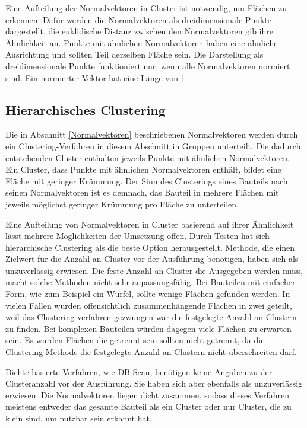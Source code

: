 \smallskip

Eine Aufteilung der Normalvektoren in Cluster ist notwendig, um Flächen zu erkennen. Dafür werden die Normalvektoren als dreidimensionale Punkte dargestellt, die euklidische Distanz zwischen den Normalvektoren gib ihre Ähnlichkeit an. 
Punkte mit ähnlichen Normalvektoren haben eine ähnliche Ausrichtung und sollten Teil derselben Fläche sein. Die Darstellung als dreidimensionale Punkte funktioniert nur, wenn alle Normalvektoren normiert sind. Ein normierter Vektor hat eine Länge von 1. 

\subsection{Hierarchisches Clustering}
\label{Hierarchisches Clustering}

Die in Abschnitt \ref{Normalvektoren} beschriebenen Normalvektoren werden durch ein Clustering-Verfahren in diesem Abschnitt in Gruppen unterteilt. Die dadurch entstehenden Cluster enthalten jeweils Punkte mit ähnlichen Normalvektoren. Ein Cluster, dass Punkte mit ähnlichen Normalvektoren enthält,
bildet eine Fläche mit geringer Krümmung. Der Sinn des Clusterings eines Bauteils nach seinen Normalvektoren ist es demnach, das Bauteil in mehrere Flächen mit jeweils möglichst geringer Krümmung pro Fläche zu unterteilen.

\smallskip

Eine Aufteilung von Normalvektoren in Cluster basierend auf ihrer Ähnlichkeit lässt mehrere Möglichkeiten der Umsetzung offen. Durch Testen hat sich hierarchische Clustering als die beste Option herausgestellt. 
Methode, die einen Zielwert für die Anzahl an Cluster vor der Ausführung benötigen, haben sich als unzuverlässig erwiesen. Die feste Anzahl an Cluster die Ausgegeben werden muss, macht solche Methoden nicht sehr anpassungsfähig. 
Bei Bauteilen mit einfacher Form, wie zum Beispiel ein Würfel, sollte wenige Flächen gefunden werden. In vielen Fällen wurden offensichtlich zusammenhängende Flächen in zwei geteilt, 
weil das Clustering verfahren gezwungen war die festgelegte Anzahl an Clustern zu finden. Bei komplexen Bauteilen würden dagegen viele Flächen zu erwarten sein. Es wurden Flächen die getrennt sein sollten nicht getrennt, 
da die Clustering Methode die festgelegte Anzahl an Clustern nicht überschreiten darf.

Dichte basierte Verfahren, wie DB-Scan, benötigen keine Angaben zu der Clusteranzahl vor der Ausführung. Sie haben sich aber ebenfalls als unzuverlässig erwiesen. Die Normalvektoren liegen dicht zusammen, 
sodass dieses Verfahren meistens entweder das gesamte Bauteil als ein Cluster oder nur Cluster, die zu klein sind, um nutzbar sein erkannt hat.

